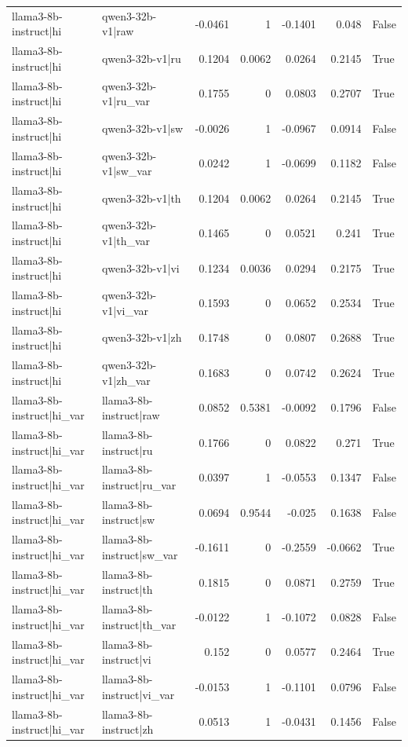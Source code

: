\begin{table}
\begin{tabular}{l l r r r r l}
llama3-8b-instruct|hi & qwen3-32b-v1|raw & -0.0461 & 1 & -0.1401 & 0.048 & False \\
llama3-8b-instruct|hi & qwen3-32b-v1|ru & 0.1204 & 0.0062 & 0.0264 & 0.2145 & True \\
llama3-8b-instruct|hi & qwen3-32b-v1|ru_var & 0.1755 & 0 & 0.0803 & 0.2707 & True \\
llama3-8b-instruct|hi & qwen3-32b-v1|sw & -0.0026 & 1 & -0.0967 & 0.0914 & False \\
llama3-8b-instruct|hi & qwen3-32b-v1|sw_var & 0.0242 & 1 & -0.0699 & 0.1182 & False \\
llama3-8b-instruct|hi & qwen3-32b-v1|th & 0.1204 & 0.0062 & 0.0264 & 0.2145 & True \\
llama3-8b-instruct|hi & qwen3-32b-v1|th_var & 0.1465 & 0 & 0.0521 & 0.241 & True \\
llama3-8b-instruct|hi & qwen3-32b-v1|vi & 0.1234 & 0.0036 & 0.0294 & 0.2175 & True \\
llama3-8b-instruct|hi & qwen3-32b-v1|vi_var & 0.1593 & 0 & 0.0652 & 0.2534 & True \\
llama3-8b-instruct|hi & qwen3-32b-v1|zh & 0.1748 & 0 & 0.0807 & 0.2688 & True \\
llama3-8b-instruct|hi & qwen3-32b-v1|zh_var & 0.1683 & 0 & 0.0742 & 0.2624 & True \\
llama3-8b-instruct|hi_var & llama3-8b-instruct|raw & 0.0852 & 0.5381 & -0.0092 & 0.1796 & False \\
llama3-8b-instruct|hi_var & llama3-8b-instruct|ru & 0.1766 & 0 & 0.0822 & 0.271 & True \\
llama3-8b-instruct|hi_var & llama3-8b-instruct|ru_var & 0.0397 & 1 & -0.0553 & 0.1347 & False \\
llama3-8b-instruct|hi_var & llama3-8b-instruct|sw & 0.0694 & 0.9544 & -0.025 & 0.1638 & False \\
llama3-8b-instruct|hi_var & llama3-8b-instruct|sw_var & -0.1611 & 0 & -0.2559 & -0.0662 & True \\
llama3-8b-instruct|hi_var & llama3-8b-instruct|th & 0.1815 & 0 & 0.0871 & 0.2759 & True \\
llama3-8b-instruct|hi_var & llama3-8b-instruct|th_var & -0.0122 & 1 & -0.1072 & 0.0828 & False \\
llama3-8b-instruct|hi_var & llama3-8b-instruct|vi & 0.152 & 0 & 0.0577 & 0.2464 & True \\
llama3-8b-instruct|hi_var & llama3-8b-instruct|vi_var & -0.0153 & 1 & -0.1101 & 0.0796 & False \\
llama3-8b-instruct|hi_var & llama3-8b-instruct|zh & 0.0513 & 1 & -0.0431 & 0.1456 & False \\

\end{tabular}
\end{table}
